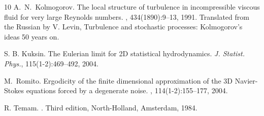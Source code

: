 \documentclass[11pt]{preprint}
\begin{document}
\begin{thebibliography}{10}
A.~N.\ Kolmogorov.
\newblock The local structure of turbulence in incompressible viscous fluid for
  very large {R}eynolds numbers.
, 434(1890):9--13, 1991.
\newblock Translated from the Russian by V. Levin, Turbulence and stochastic
  processes: Kolmogorov's ideas 50 years on.

S. B. Kuksin.
\newblock The Eulerian limit for 2D statistical hydrodynamics.
\newblock \emph{J. Statist. Phys.}, 115(1-2):469--492, 2004. %

M.\ Romito.
\newblock Ergodicity of the finite dimensional approximation of the 3{D}
  {N}avier-{S}tokes equations forced by a degenerate noise.
, 114(1-2):155--177, 2004.

R. Temam.
.
\newblock Third edition, North-Holland, Amsterdam, 1984.%
\end{thebibliography}
\end{document}
